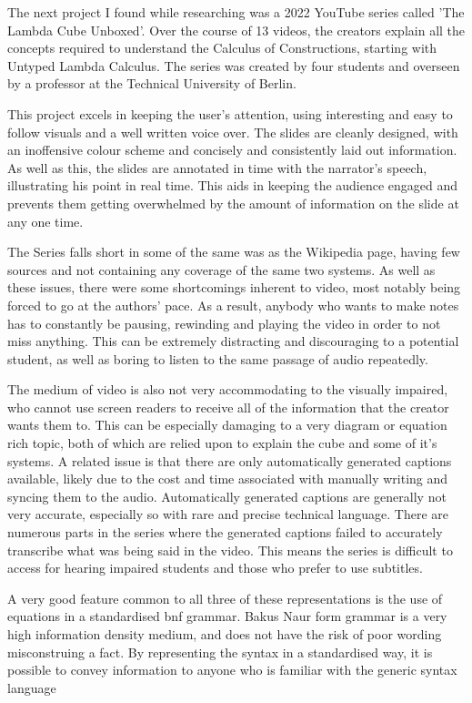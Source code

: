 \documentclass{l4proj}
\begin{document}
The next project I found while researching was a 2022 YouTube series called 'The Lambda Cube Unboxed'.  Over the course of 13 videos, the creators explain all the concepts required to understand the Calculus of Constructions, starting with Untyped Lambda Calculus.  The series was created by four students and overseen by a professor at the Technical University of Berlin.

This project excels in keeping the user's attention, using interesting and easy to follow visuals and a well written voice over.  The slides are cleanly designed, with an inoffensive colour scheme and concisely and consistently laid out information.  As well as this, the slides are annotated in time with the narrator's speech, illustrating his point in real time.  This aids in keeping the audience engaged and prevents them getting overwhelmed by the amount of information on the slide at any one time.

The Series falls short in some of the same was as the Wikipedia page, having few sources and not containing any coverage of the same two systems.  As well as these issues, there were some shortcomings inherent to video, most notably being forced to go at the authors' pace.  As a result, anybody who wants to make notes has to constantly be pausing, rewinding and playing the video in order to not miss anything.  This can be extremely distracting and discouraging to a potential student, as well as boring to listen to the same passage of audio repeatedly.

The medium of video is also not very accommodating to the visually impaired, who cannot use screen readers to receive all of the information that the creator wants them to.  This can be especially damaging to a very diagram or equation rich topic, both of which are relied upon to explain the cube and some of it's systems.  A related issue is that there are only automatically generated captions available, likely due to the cost and time associated with manually writing and syncing them to the audio.  Automatically generated captions are generally not very accurate, especially so with rare and precise technical language.  There are numerous parts in the series where the generated captions failed to accurately transcribe what was being said in the video.  This means the series is difficult to access for hearing impaired students and those who prefer to use subtitles.

A very good feature common to all three of these representations is the use of equations in a standardised bnf grammar.  Bakus Naur form grammar is a very high information density medium, and does not have the risk of poor wording misconstruing a fact.  By representing the syntax in a standardised way, it is possible to convey information to anyone who is familiar with the generic syntax language
\end{document}
